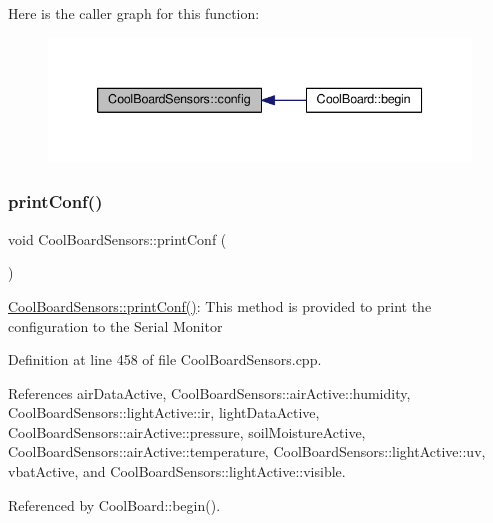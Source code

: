 Here is the caller graph for this function\+:
\nopagebreak
\begin{figure}[H]
\begin{center}
\leavevmode
\includegraphics[width=339pt]{de/d46/class_cool_board_sensors_a9a218895c5423375c33c08f2c56fb23a_icgraph}
\end{center}
\end{figure}
\mbox{\label{class_cool_board_sensors_af6fd79505815b204c178617ecf54c873}} 
\subsubsection{\texorpdfstring{print\+Conf()}{printConf()}}
{\footnotesize\ttfamily void Cool\+Board\+Sensors\+::print\+Conf (\begin{DoxyParamCaption}{ }\end{DoxyParamCaption})}

\hyperlink{class_cool_board_sensors_af6fd79505815b204c178617ecf54c873}{Cool\+Board\+Sensors\+::print\+Conf()}\+: This method is provided to print the configuration to the Serial Monitor 

Definition at line 458 of file Cool\+Board\+Sensors.\+cpp.



References air\+Data\+Active, Cool\+Board\+Sensors\+::air\+Active\+::humidity, Cool\+Board\+Sensors\+::light\+Active\+::ir, light\+Data\+Active, Cool\+Board\+Sensors\+::air\+Active\+::pressure, soil\+Moisture\+Active, Cool\+Board\+Sensors\+::air\+Active\+::temperature, Cool\+Board\+Sensors\+::light\+Active\+::uv, vbat\+Active, and Cool\+Board\+Sensors\+::light\+Active\+::visible.



Referenced by Cool\+Board\+::begin().

